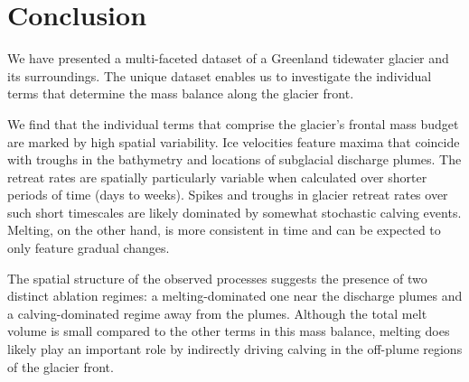 \documentclass[10pt,letterpaper]{article}
\begin{document}

\section{Conclusion}

We have presented a multi-faceted dataset of a Greenland tidewater glacier and its surroundings. The unique dataset enables us to investigate the individual terms that determine the mass balance along the glacier front. 

We find that the individual terms that comprise the glacier's frontal mass budget are marked by high spatial variability. Ice velocities feature maxima that coincide with troughs in the bathymetry and locations of subglacial discharge plumes. The retreat rates are spatially particularly variable when calculated over shorter periods of time (days to weeks). Spikes and troughs in glacier retreat rates over such short timescales are likely dominated by somewhat stochastic calving events. Melting, on the other hand, is more consistent in time and can be expected to only feature gradual changes. 

The spatial structure of the observed processes suggests the presence of two distinct ablation regimes: a melting-dominated one near the discharge plumes and a calving-dominated regime away from the plumes. Although the total melt volume is small compared to the other terms in this mass balance, melting does likely play an important role by indirectly driving calving in the off-plume regions of the glacier front.
\end{document}
